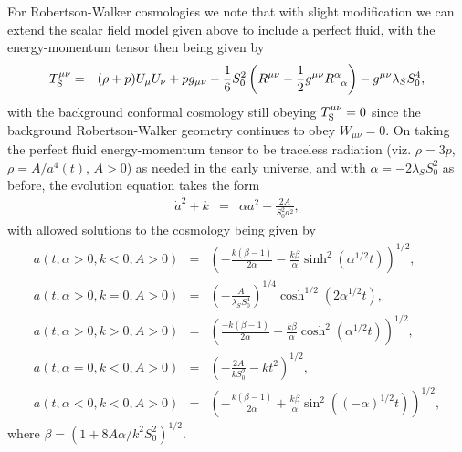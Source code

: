 For Robertson-Walker cosmologies we note that with slight modification we can extend the scalar field model given above to include a perfect fluid, with the energy-momentum tensor then being given by \cite{mannheim_1998}
%                                                                               
\begin{eqnarray}
T_{\rm S}^{\mu \nu}&=&(\rho+p)U_{\mu}U_{\nu}+pg_{\mu\nu} 
-\frac{1}{6} S_0^2\left(R^{\mu\nu}-\frac{1}{2}g^{\mu\nu}
R^\alpha_{\phantom{\alpha}\alpha}\right)-g^{\mu\nu}\lambda_S S_0^4,
\label{A17}
\end{eqnarray}                                 
%
with the background conformal cosmology still obeying $T_{\rm S}^{\mu \nu}=0$ since the background  Robertson-Walker geometry continues to obey $W_{\mu\nu}=0$.  On taking the perfect fluid energy-momentum tensor to be traceless radiation  (viz. $\rho=3p$, $\rho=A/a^4(t)$, $A>0$) as needed in the early universe, and with $\alpha =-2\lambda_{S}S^2_0$ as before, the evolution equation takes the form
%                                                                               
\begin{eqnarray}
\dot{a}^2+k&=&\alpha a^2-\frac{2A}{S_0^2a^2},
\label{A18}
\end{eqnarray}                                 
% 
with allowed solutions to the cosmology being given by  \cite{Mannheim1998} 
%
\begin{eqnarray}
a(t,\alpha>0,k<0,A>0)&=&\left(-\frac{k(\beta-1)}{2\alpha}-\frac{k\beta}{\alpha}\sinh^2(\alpha^{1/2}t)\right)^{1/2},
\nonumber \\
a(t,\alpha>0,k=0,A>0)&=&\left(-\frac{A}{\lambda_S S_0^4}\right)^{1/4}\cosh^{1/2}(2\alpha^{1/2}t),
\nonumber \\
a(t,\alpha>0,k>0,A>0)&=&\left(\frac{-k(\beta-1)}{2\alpha}+\frac{k\beta}{\alpha}\cosh^2(\alpha^{1/2}t)\right)^{1/2},
\nonumber\\
a(t,\alpha=0,k<0,A>0)&=&\left(-\frac{2A}{kS_0^2}-kt^2\right)^{1/2},
\nonumber \\
a(t,\alpha<0,k<0,A>0)&=&\left(-\frac{k(\beta-1)}{2\alpha}+\frac{k\beta}{\alpha}\sin^2((-\alpha)^{1/2}t)\right)^{1/2},
\label{A19}
\end{eqnarray}
%
where $\beta=(1+8A\alpha/k^2S_0^2)^{1/2}$.

